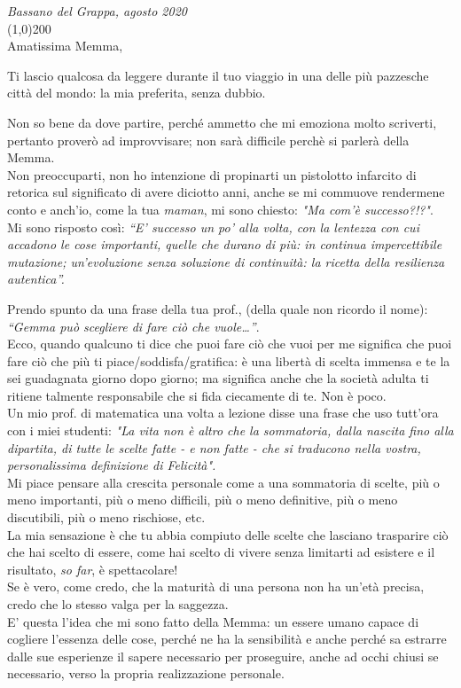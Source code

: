 \documentclass[11pt]{article}
\begin{document}
\pagestyle{empty}
\onehalfspacing
\emph{Bassano del Grappa, agosto 2020} \\
\line(1,0){200} \\

Amatissima Memma,

Ti lascio qualcosa da leggere durante il tuo viaggio in una delle più pazzesche città del mondo: la mia preferita, senza dubbio.

Non so bene da dove partire, perché ammetto che mi emoziona molto scriverti, pertanto proverò ad improvvisare; non sarà difficile perchè si parlerà della Memma.\\
Non preoccuparti, non ho intenzione di propinarti un pistolotto infarcito di retorica sul significato di avere diciotto anni, anche se mi commuove rendermene conto e anch'io, come la tua {\em maman}, mi sono chiesto: {\em "Ma com'è successo?!?"}.\\
Mi sono risposto così: {\em “E’ successo un po’ alla volta, con la lentezza con cui accadono le cose importanti, quelle che durano di più: in continua impercettibile mutazione; un’evoluzione senza soluzione di continuità: la ricetta della resilienza autentica”.}

Prendo spunto da una frase della tua prof., (della quale non ricordo il nome): {\em “Gemma può scegliere di fare ciò che vuole\dots”}.\\ Ecco, quando qualcuno ti dice che puoi fare ciò che vuoi per me significa che puoi fare ciò che più ti piace/soddisfa/gratifica: è una libertà di scelta immensa e te la sei guadagnata giorno dopo giorno; ma significa anche che la società adulta ti ritiene talmente responsabile che si fida ciecamente di te. Non è poco.\\
Un mio prof. di matematica una volta a lezione disse una frase che uso tutt'ora con i miei studenti: {\em "La vita non è altro che la sommatoria, dalla nascita fino alla dipartita, di tutte le scelte fatte - e non fatte - che si traducono nella vostra, personalissima definizione di Felicità".}\\
Mi piace pensare alla crescita personale come a una sommatoria di scelte, più o meno importanti, più o meno difficili, più o meno definitive, più o meno discutibili, più o meno rischiose, etc.\\
La mia sensazione è che tu abbia compiuto delle scelte che lasciano trasparire ciò che hai scelto di essere, come hai scelto di vivere senza limitarti ad esistere e il risultato,  {\em so far}, è spettacolare!\\
Se è vero, come credo, che la maturità di una persona non ha un'età precisa, credo che lo stesso valga per la saggezza.\\ E' questa l'idea che mi sono fatto della Memma: un essere umano capace di cogliere l'essenza delle cose, perché ne ha la sensibilità e anche perché sa estrarre dalle sue esperienze il sapere necessario per proseguire, anche ad occhi chiusi se necessario, verso la propria realizzazione personale.
\end{document}
